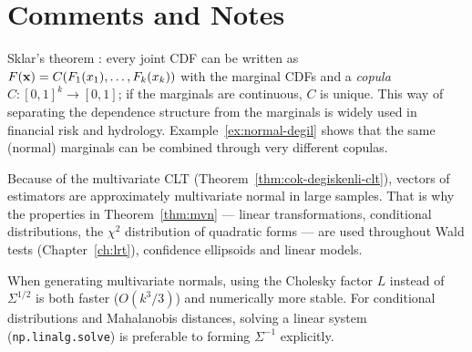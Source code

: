 \documentclass[main.tex]{subfiles}
\begin{document}
\section{Comments and Notes}

\begin{remark}[Copulas]
Sklar's theorem \cite{sklar59}: every joint CDF can be written as $F(\mathbf{x})=C(F_1(x_1),\dots,F_k(x_k))$ with the marginal CDFs and a \emph{copula} $C:[0,1]^k\to[0,1]$; if the marginals are continuous, $C$ is unique. This way of separating the dependence structure from the marginals is widely used in financial risk and hydrology. Example~\ref{ex:normal-degil} shows that the same (normal) marginals can be combined through very different copulas.
\end{remark}

\begin{remark}
Because of the multivariate CLT (Theorem~\ref{thm:cok-degiskenli-clt}), vectors of estimators are approximately multivariate normal in large samples. That is why the properties in Theorem~\ref{thm:mvn} --- linear transformations, conditional distributions, the $\chi^2$ distribution of quadratic forms --- are used throughout Wald tests (Chapter~\ref{ch:lrt}), confidence ellipsoids and linear models.
\end{remark}

\begin{remark}
When generating multivariate normals, using the Cholesky factor $L$ instead of $\Sigma^{1/2}$ is both faster ($O(k^3/3)$) and numerically more stable. For conditional distributions and Mahalanobis distances, solving a linear system (\texttt{np.linalg.solve}) is preferable to forming $\Sigma^{-1}$ explicitly.
\end{remark}

\end{document}
